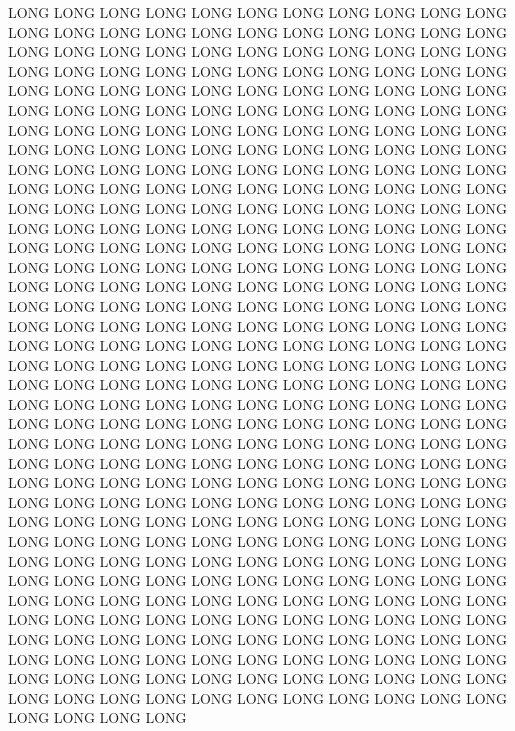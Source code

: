 \documentclass{article}
\begin{document}
LONG LONG LONG LONG LONG LONG LONG LONG LONG LONG LONG LONG LONG LONG LONG LONG LONG LONG LONG LONG LONG LONG LONG LONG LONG LONG LONG LONG LONG LONG LONG LONG LONG LONG LONG LONG LONG LONG LONG LONG LONG LONG LONG LONG LONG LONG LONG LONG LONG LONG LONG LONG LONG LONG LONG LONG LONG LONG LONG LONG LONG LONG LONG LONG LONG LONG LONG LONG LONG LONG LONG LONG LONG LONG LONG LONG LONG LONG LONG LONG LONG LONG LONG LONG LONG LONG LONG LONG LONG LONG LONG LONG LONG LONG LONG LONG LONG LONG LONG LONG LONG LONG LONG LONG LONG LONG LONG LONG LONG LONG LONG LONG LONG LONG LONG LONG LONG LONG LONG LONG LONG LONG LONG LONG LONG LONG LONG LONG LONG LONG LONG LONG LONG LONG LONG LONG LONG LONG LONG LONG LONG LONG LONG LONG LONG LONG LONG LONG LONG LONG LONG LONG LONG LONG LONG LONG LONG LONG LONG LONG LONG LONG LONG LONG LONG LONG LONG LONG LONG LONG LONG LONG LONG LONG LONG LONG LONG LONG LONG LONG LONG LONG LONG LONG LONG LONG LONG LONG LONG LONG LONG LONG LONG LONG LONG LONG LONG LONG LONG LONG LONG LONG LONG LONG LONG LONG LONG LONG LONG LONG LONG LONG LONG LONG LONG LONG LONG LONG LONG LONG LONG LONG LONG LONG LONG LONG LONG LONG LONG LONG LONG LONG LONG LONG LONG LONG LONG LONG LONG LONG LONG LONG LONG LONG LONG LONG LONG LONG LONG LONG LONG LONG LONG LONG LONG LONG LONG LONG LONG LONG LONG LONG LONG LONG LONG LONG LONG LONG LONG LONG LONG LONG LONG LONG LONG LONG LONG LONG LONG LONG LONG LONG LONG LONG LONG LONG LONG LONG LONG LONG LONG LONG LONG LONG LONG LONG LONG LONG LONG LONG LONG LONG LONG LONG LONG LONG LONG LONG LONG LONG LONG LONG LONG LONG LONG LONG LONG LONG LONG LONG LONG LONG LONG LONG LONG LONG LONG LONG LONG LONG LONG LONG LONG LONG LONG LONG LONG LONG LONG LONG LONG LONG LONG LONG LONG LONG LONG LONG LONG LONG LONG LONG LONG LONG LONG LONG LONG LONG LONG LONG LONG LONG LONG LONG LONG LONG LONG LONG LONG LONG LONG LONG LONG LONG LONG LONG LONG LONG LONG LONG LONG LONG LONG LONG LONG LONG LONG LONG LONG LONG LONG LONG LONG LONG LONG LONG LONG LONG LONG LONG 
\end{document}
